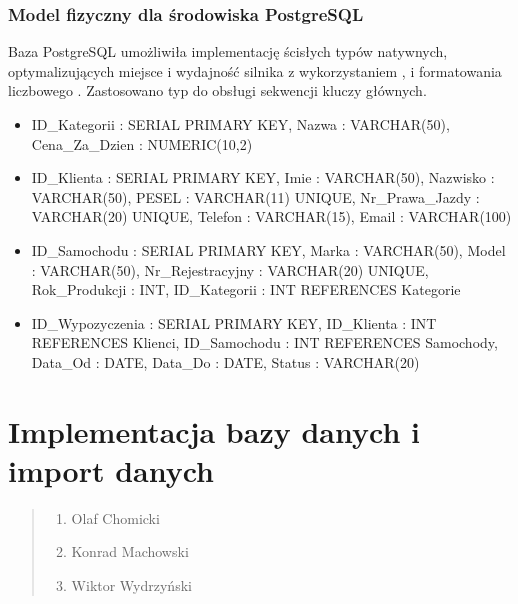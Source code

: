 \documentclass[a4paper,11pt,english,openany,oneside]{sphinxmanual}
\begin{document}
\subsection{Model fizyczny dla środowiska PostgreSQL}
\label{\detokenize{rozdzial_3/index:model-fizyczny-dla-srodowiska-postgresql}}
\sphinxAtStartPar
Baza PostgreSQL umożliwiła implementację ścisłych typów natywnych, optymalizujących miejsce i wydajność silnika z wykorzystaniem ,  i formatowania liczbowego . Zastosowano typ  do obsługi sekwencji kluczy głównych.
\begin{itemize}
\item {} 
\sphinxAtStartPar
{} ID\_Kategorii : SERIAL PRIMARY KEY, Nazwa : VARCHAR(50), Cena\_Za\_Dzien : NUMERIC(10,2)

\item {} 
\sphinxAtStartPar
{} ID\_Klienta : SERIAL PRIMARY KEY, Imie : VARCHAR(50), Nazwisko : VARCHAR(50), PESEL : VARCHAR(11) UNIQUE, Nr\_Prawa\_Jazdy : VARCHAR(20) UNIQUE, Telefon : VARCHAR(15), Email : VARCHAR(100)

\item {} 
\sphinxAtStartPar
{} ID\_Samochodu : SERIAL PRIMARY KEY, Marka : VARCHAR(50), Model : VARCHAR(50), Nr\_Rejestracyjny : VARCHAR(20) UNIQUE, Rok\_Produkcji : INT, ID\_Kategorii : INT REFERENCES Kategorie

\item {} 
\sphinxAtStartPar
{} ID\_Wypozyczenia : SERIAL PRIMARY KEY, ID\_Klienta : INT REFERENCES Klienci, ID\_Samochodu : INT REFERENCES Samochody, Data\_Od : DATE, Data\_Do : DATE, Status : VARCHAR(20)

\end{itemize}

\sphinxstepscope


\chapter{Implementacja bazy danych i import danych}
\label{\detokenize{rozdzial_4/index:implementacja-bazy-danych-i-import-danych}}\label{\detokenize{rozdzial_4/index::doc}}\begin{quote}\begin{description}
\begin{enumerate}
%
\item {} 
\sphinxAtStartPar
Olaf Chomicki

\item {} 
\sphinxAtStartPar
Konrad Machowski

\item {} 
\sphinxAtStartPar
Wiktor Wydrzyński

\end{enumerate}

\end{description}\end{quote}
\end{document}
